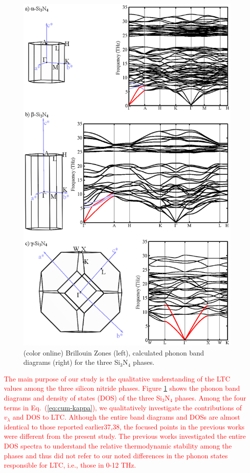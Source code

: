 \documentclass[twocolumn,amsmath,amssymb,a4paper,prb,superscriptaddress,floatfix]{revtex4-1}
\begin{document}
\begin{figure}[ht]
 \begin{center}
  \includegraphics[width=0.90\linewidth]{Fig4_ver5_338_resize_woDOS.eps}
  \caption{(color online) Brillouin Zones (left), calculated phonon band
  diagrams (right) for the three
  Si$_3$N$_4$ phases. 
  \label{fig:Fig4_ver5_338} }
 \end{center}
\end{figure}

\textcolor{red}{The main purpose of our study is the qualitative
understanding of the LTC values among the three silicon nitride
phases. Figure \ref{fig:Fig4_ver5_338} shows the phonon band diagrams
and density of states (DOS) of the three Si$_3$N$_4$ phases. Among the
four terms in Eq.~(\ref{eq:cum-kappa}), we qualitatively investigate the
contributions of $v_\lambda$ and DOS to LTC. Although the entire band
diagrams and DOSs are almost identical to those reported earlier37,38,
the focused points in the previous works were different from the present
study. The previous works investigated the entire DOS spectra to
understand the relative thermodynamic stability among the phases and
thus did not refer to our noted differences in the phonon states
responsible for LTC, i.e., those in 0-12 THz.}
\end{document}
